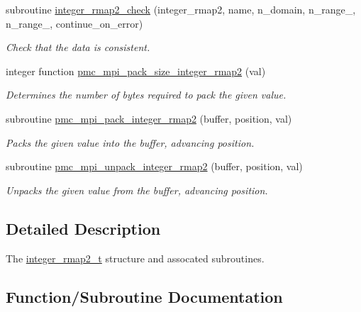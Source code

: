 \begin{DoxyCompactItemize}
subroutine \mbox{\hyperlink{namespacepmc__integer__rmap2_a2e4c3d69cb5dbe25f73b328fc08a4c71}{integer\+\_\+rmap2\+\_\+check}} (integer\+\_\+rmap2, name, n\+\_\+domain, n\+\_\+range\+\_, n\+\_\+range\+\_, continue\+\_\+on\+\_\+error)
\begin{DoxyCompactList}\small\item\em Check that the data is consistent. \end{DoxyCompactList}\item 
integer function \mbox{\hyperlink{namespacepmc__integer__rmap2_a31c142e859b51a8e5a68cd40635c3dff}{pmc\+\_\+mpi\+\_\+pack\+\_\+size\+\_\+integer\+\_\+rmap2}} (val)
\begin{DoxyCompactList}\small\item\em Determines the number of bytes required to pack the given value. \end{DoxyCompactList}\item 
subroutine \mbox{\hyperlink{namespacepmc__integer__rmap2_a10ff7b71918c4a8e48febe2cffe0fbe6}{pmc\+\_\+mpi\+\_\+pack\+\_\+integer\+\_\+rmap2}} (buffer, position, val)
\begin{DoxyCompactList}\small\item\em Packs the given value into the buffer, advancing position. \end{DoxyCompactList}\item 
subroutine \mbox{\hyperlink{namespacepmc__integer__rmap2_a803859f2ba244b1035bba011911a1b31}{pmc\+\_\+mpi\+\_\+unpack\+\_\+integer\+\_\+rmap2}} (buffer, position, val)
\begin{DoxyCompactList}\small\item\em Unpacks the given value from the buffer, advancing position. \end{DoxyCompactList}\end{DoxyCompactItemize}


\subsection{Detailed Description}
The \mbox{\hyperlink{structpmc__integer__rmap2_1_1integer__rmap2__t}{integer\+\_\+rmap2\+\_\+t}} structure and assocated subroutines. 

\subsection{Function/\+Subroutine Documentation}
\mbox{\label{namespacepmc__integer__rmap2_ae9b0fce5017e7fe869e8e408c730f4d3}} 
